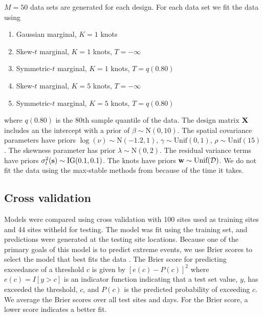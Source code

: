 \documentclass[11pt]{article}
\begin{document}
$M = 50$ data sets are generated for each design.
For each data set we fit the data using
\begin{enumerate} \setlength{\itemsep}{-0.5em}
  \item Gaussian marginal, $K=1$ knots
  \item Skew-$t$ marginal, $K=1$ knots, $T=-\infty$
  \item Symmetric-$t$ marginal, $K=1$ knots, $T=q(0.80)$
  \item Skew-$t$ marginal, $K=5$ knots, $T=-\infty$
  \item Symmetric-$t$ marginal, $K=5$ knots, $T=q(0.80)$
\end{enumerate}
where $q(0.80)$ is the 80th sample quantile of the data.
The design matrix $\mbox{\bf X}$ includes an the intercept with a prior of $\beta \sim \text{N}(0, 10)$.
The spatial covariance parameters have priors $\log(\nu) \sim \text{N}(-1.2, 1)$, $\gamma \sim \text{Unif}(0, 1)$, $\rho \sim \text{Unif}(15)$.
The skewness parameter has prior $\lambda \sim \text{N}(0, 2)$.
The residual variance terms have priors $\sigma^2_t(\mbox{\bf s}) \sim \text{IG}(0.1, 0.1)$.
The knots have priors $\mbox{\bf w} \sim \text{Unif}({\cal D})$.
We do not fit the data using the max-stable methods from \citet{Reich2012} because of the time it takes.

\subsection{Cross validation}\label{s:modelselect}
Models were compared using cross validation with 100 sites used as training sites and 44 sites witheld for testing.
The model was fit using the training set, and predictions were generated at the testing site locations.
Because one of the primary goals of this model is to predict extreme events, we use Brier scores to select the model that best fits the data \citep{Gneiting2007}.
The Brier score for predicting exceedance of a threshold $c$ is given by $[e(c) - P(c)]^2$ where $e(c) = I[y>c]$ is an indicator function indicating that a test set value, $y$, has exceeded the threshold, $c$, and $P(c)$ is the predicted probability of exceeding $c$.
We average the Brier scores over all test sites and days.
For the Brier score, a lower score indicates a better fit.
\end{document}
